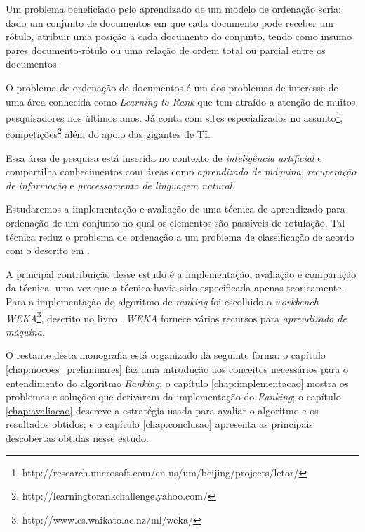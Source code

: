 Um problema beneficiado pelo aprendizado de um modelo de ordenação seria: dado um conjunto de documentos em que cada documento pode receber um rótulo, atribuir uma posição a cada documento do conjunto, tendo como insumo pares documento-rótulo ou uma relação de ordem total ou parcial entre os documentos.

O problema de ordenação de documentos é um dos problemas de interesse de uma área  conhecida como \emph{Learning to Rank} que tem atraído a atenção de muitos pesquisadores nos últimos anos. Já conta com sites especializados no assunto\footnote{http://research.microsoft.com/en-us/um/beijing/projects/letor/}, competições\footnote{http://learningtorankchallenge.yahoo.com/} além do apoio das gigantes de TI.

Essa área de pesquisa está inserida no contexto de \emph{inteligência artificial} e compartilha conhecimentos com áreas como \emph{aprendizado de máquina}, \emph{recuperação de informação} e \emph{processamento de linguagem natural}.

Estudaremos a implementação e avaliação de uma técnica de aprendizado para ordenação de um conjunto no qual os elementos são passíveis de rotulação. Tal técnica reduz o problema de ordenação a um problema de classificação de acordo com o descrito em \cite{langford08}.

A principal contribuição desse estudo é a implementação, avaliação e comparação da técnica, uma vez que a técnica havia sido especificada apenas teoricamente. Para a implementação do algoritmo de \emph{ranking} foi escolhido o  \emph{workbench WEKA}\footnote{http://www.cs.waikato.ac.nz/ml/weka/}, descrito no livro \cite{wekabook}. \emph{WEKA} fornece vários recursos para \emph{aprendizado de máquina}.

O restante desta monografia está organizado da seguinte forma: o capítulo \ref{chap:nocoes_preliminares} faz uma introdução aos conceitos necessários para o entendimento do algoritmo \emph{Ranking}; o capítulo \ref{chap:implementacao} mostra os problemas e soluções que derivaram da implementação do \emph{Ranking}; o capítulo \ref{chap:avaliacao} descreve a estratégia usada para avaliar o algoritmo e os resultados obtidos; e o capítulo \ref{chap:conclusao} apresenta as principais descobertas obtidas nesse estudo.
